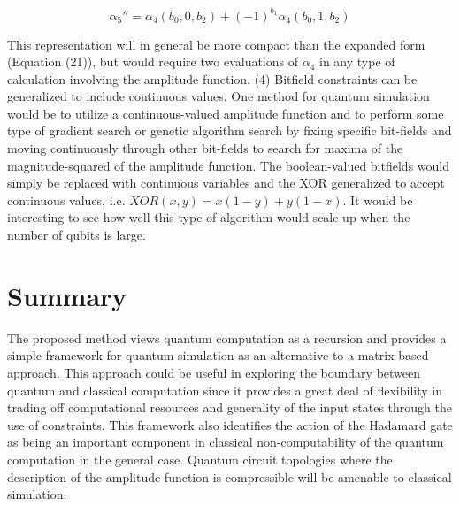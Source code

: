 \documentclass[reqno]{amsart}
\theoremstyle{definition}
\theoremstyle{remark}
\begin{document}
\begin{equation}
\alpha_5''  = \alpha_4 (b_0,0,b_2) + (-1)^{b_1}\alpha_4 (b_0,1,b_2)
\end{equation}

\noindent
This representation will in general be more compact than the expanded form (Equation (21)), but would require two evaluations of $\alpha_4$ in any type of calculation involving the amplitude function. \newline
\newline
\noindent
(4) Bitfield constraints can be generalized to include continuous values. One method for quantum simulation would be to utilize a continuous-valued amplitude function and to perform some type of gradient search or genetic algorithm search by fixing specific bit-fields and moving continuously through other bit-fields to search for maxima of the magnitude-squared of the amplitude function. The boolean-valued bitfields would simply be replaced with continuous variables and the XOR generalized to accept continuous values, i.e. $XOR(x,y)=x(1-y)+y(1-x)$. It would be interesting to see how well this type of algorithm would scale up when the number of qubits is large.


\newpage
\section{Summary}
\noindent
The proposed method views quantum computation as a recursion and provides a simple framework for quantum simulation as an alternative to a matrix-based approach. This approach could be useful in exploring the boundary between quantum and classical computation since it provides a great deal of flexibility in trading off computational resources and generality of the input states through the use of constraints. This framework also identifies the action of the Hadamard gate as being an important component in classical non-computability of the quantum computation in the general case. Quantum circuit topologies where the description of the amplitude function is compressible will be amenable to classical simulation.




\end{document}
